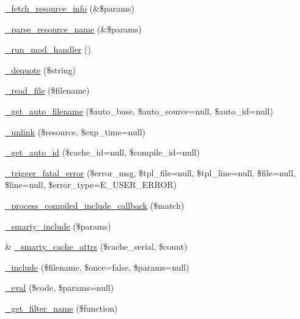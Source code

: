 \begin{DoxyCompactItemize}
\item 
\mbox{\hyperlink{class_smarty_a0c3ac497dbe0e595d4f2a85f1168a219}{\+\_\+fetch\+\_\+resource\+\_\+info}} (\&\$params)
\item 
\mbox{\hyperlink{class_smarty_a3fd3782e935db8cbac33da3d735df988}{\+\_\+parse\+\_\+resource\+\_\+name}} (\&\$params)
\item 
\mbox{\hyperlink{class_smarty_aadef62274bb4693faadaa1bfbfddae6f}{\+\_\+run\+\_\+mod\+\_\+handler}} ()
\item 
\mbox{\hyperlink{class_smarty_a48d43e818f2469134f3202f1a4256917}{\+\_\+dequote}} (\$string)
\item 
\mbox{\hyperlink{class_smarty_a5aca16bc6189ba04a7f0a807ca08ff71}{\+\_\+read\+\_\+file}} (\$filename)
\item 
\mbox{\hyperlink{class_smarty_a3e145fee368d93f35313bcb7018c1a76}{\+\_\+get\+\_\+auto\+\_\+filename}} (\$auto\+\_\+base, \$auto\+\_\+source=null, \$auto\+\_\+id=null)
\item 
\mbox{\hyperlink{class_smarty_ab5aba685ce31a74ce598d75f623361dd}{\+\_\+unlink}} (\$resource, \$exp\+\_\+time=null)
\item 
\mbox{\hyperlink{class_smarty_ae59d86c80bb3e74dbe8831f7a0a0687c}{\+\_\+get\+\_\+auto\+\_\+id}} (\$cache\+\_\+id=null, \$compile\+\_\+id=null)
\item 
\mbox{\hyperlink{class_smarty_a069f86732ff92f739c488416e0958307}{\+\_\+trigger\+\_\+fatal\+\_\+error}} (\$error\+\_\+msg, \$tpl\+\_\+file=null, \$tpl\+\_\+line=null, \$file=null, \$line=null, \$error\+\_\+type=E\+\_\+\+U\+S\+E\+R\+\_\+\+E\+R\+R\+OR)
\item 
\mbox{\hyperlink{class_smarty_a7ee77f3dd4e8b79f3f070b20e890af00}{\+\_\+process\+\_\+compiled\+\_\+include\+\_\+callback}} (\$match)
\item 
\mbox{\hyperlink{class_smarty_a2636e88dc9c8c3876aa63720c7d6ac25}{\+\_\+smarty\+\_\+include}} (\$params)
\item 
\& \mbox{\hyperlink{class_smarty_accf8fe1e81964b9abae199964a229c5b}{\+\_\+smarty\+\_\+cache\+\_\+attrs}} (\$cache\+\_\+serial, \$count)
\item 
\mbox{\hyperlink{class_smarty_a9e571fe5ba948fca1a9b31ac69e24546}{\+\_\+include}} (\$filename, \$once=false, \$params=null)
\item 
\mbox{\hyperlink{class_smarty_a9b47d457e9e3d4d47a696d77dfa43e7f}{\+\_\+eval}} (\$code, \$params=null)
\item 
\mbox{\hyperlink{class_smarty_a00c69a4528403c73041513fb5792a2a1}{\+\_\+get\+\_\+filter\+\_\+name}} (\$function)
\end{DoxyCompactItemize}
